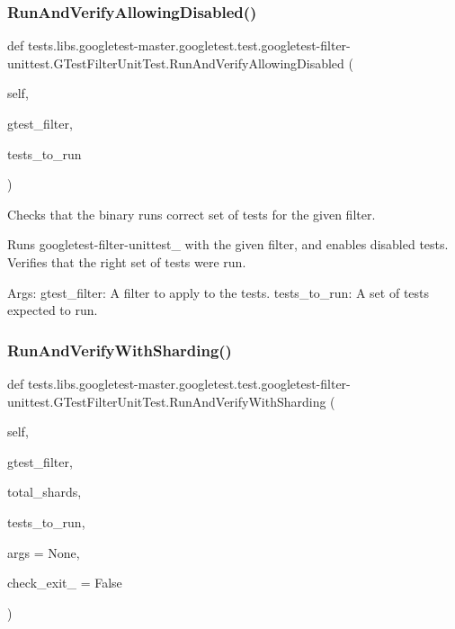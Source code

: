 \subsubsection{\texorpdfstring{Run\+And\+Verify\+Allowing\+Disabled()}{RunAndVerifyAllowingDisabled()}}
{\footnotesize\ttfamily def tests.\+libs.\+googletest-\/master.\+googletest.\+test.\+googletest-\/filter-\/unittest.\+G\+Test\+Filter\+Unit\+Test.\+Run\+And\+Verify\+Allowing\+Disabled (\begin{DoxyParamCaption}\item[{}]{self,  }\item[{}]{gtest\+\_\+filter,  }\item[{}]{tests\+\_\+to\+\_\+run }\end{DoxyParamCaption})}

\begin{DoxyVerb}Checks that the binary runs correct set of tests for the given filter.

Runs googletest-filter-unittest_ with the given filter, and enables
disabled tests. Verifies that the right set of tests were run.

Args:
  gtest_filter: A filter to apply to the tests.
  tests_to_run: A set of tests expected to run.
\end{DoxyVerb}
 \mbox{\label{classtests_1_1libs_1_1googletest-master_1_1googletest_1_1test_1_1googletest-filter-unittest_1_1GTestFilterUnitTest_a7dc909419d67e1bfb4b4712026bd87f4}} 
\subsubsection{\texorpdfstring{Run\+And\+Verify\+With\+Sharding()}{RunAndVerifyWithSharding()}}
{\footnotesize\ttfamily def tests.\+libs.\+googletest-\/master.\+googletest.\+test.\+googletest-\/filter-\/unittest.\+G\+Test\+Filter\+Unit\+Test.\+Run\+And\+Verify\+With\+Sharding (\begin{DoxyParamCaption}\item[{}]{self,  }\item[{}]{gtest\+\_\+filter,  }\item[{}]{total\+\_\+shards,  }\item[{}]{tests\+\_\+to\+\_\+run,  }\item[{}]{args = {\ttfamily None},  }\item[{}]{check\+\_\+exit\+\_ = {\ttfamily False} }\end{DoxyParamCaption})}

